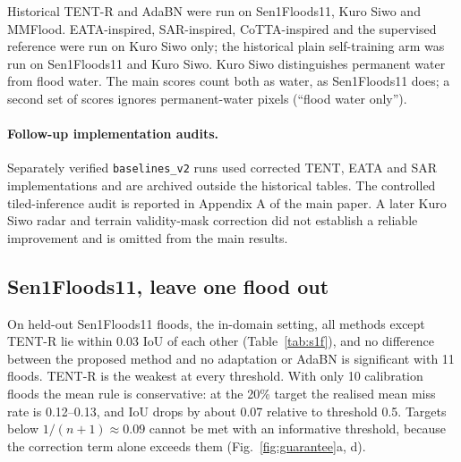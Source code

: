 Historical TENT-R and AdaBN were run on Sen1Floods11, Kuro Siwo and MMFlood. EATA-inspired, SAR-inspired, CoTTA-inspired and the supervised reference were run on Kuro Siwo only; the historical plain self-training arm was run on Sen1Floods11 and Kuro Siwo. Kuro Siwo distinguishes permanent water from flood water. The main scores count both as water, as Sen1Floods11 does; a second set of scores ignores permanent-water pixels (``flood water only'').

\paragraph{Follow-up implementation audits.} Separately verified \texttt{baselines\_v2} runs used corrected TENT, EATA and SAR implementations and are archived outside the historical tables. The controlled tiled-inference audit is reported in Appendix A of the main paper. A later Kuro Siwo radar and terrain validity-mask correction did not establish a reliable improvement and is omitted from the main results.

\subsection{Sen1Floods11, leave one flood out}
On held-out Sen1Floods11 floods, the in-domain setting, all methods except TENT-R lie within 0.03 IoU of each other (Table~\ref{tab:s1f}), and no difference between the proposed method and no adaptation or AdaBN is significant with 11 floods. TENT-R is the weakest at every threshold. With only 10 calibration floods the mean rule is conservative: at the 20\% target the realised mean miss rate is 0.12--0.13, and IoU drops by about 0.07 relative to threshold 0.5. Targets below $1/(n+1)\approx0.09$ cannot be met with an informative threshold, because the correction term alone exceeds them (Fig.~\ref{fig:guarantee}a, d).

\begin{table}[pos=t]
\caption{Sen1Floods11, leave one flood out (11 floods, radar only): mean IoU at threshold 0.5, under the mean rule (Eq.~\ref{eq:mean}) and under the per-flood rule (Eq.~\ref{eq:flood}), with the number of floods that meet the 20\% target under the per-flood rule. Best value per column in bold.}
\label{tab:s1f}
\centering
\small

\end{table}

